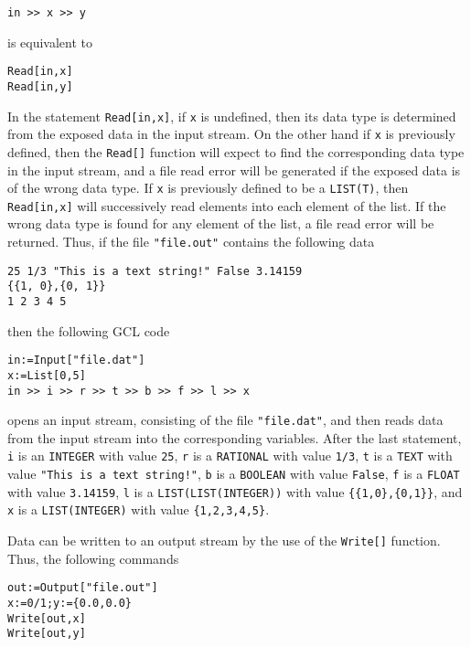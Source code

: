 \begin{verbatim}
in >> x >> y
\end{verbatim}
 
\noindent
is equivalent to 

\begin{verbatim}
Read[in,x]
Read[in,y]
\end{verbatim}

\noindent
In the statement \verb+Read[in,x]+, if \verb+x+ is undefined, then its
data type is determined from the exposed data in the input stream.  On
the other hand if \verb+x+ is previously defined, then the
\verb+Read[]+ function will expect to find the corresponding data type
in the input stream, and a file read error will be generated if the
exposed data is of the wrong data type.  If \verb+x+ is previously
defined to be a \verb+LIST(T)+, then \verb+Read[in,x]+ will
successively read elements into each element of the list.  If the
wrong data type is found for any element of the list, a file read
error will be returned.  Thus, if the file \verb+"file.out"+ contains
the following data

\begin{verbatim}
25 1/3 "This is a text string!" False 3.14159 
{{1, 0},{0, 1}}
1 2 3 4 5
\end{verbatim}

\noindent
then the following GCL code

\begin{verbatim}
in:=Input["file.dat"]
x:=List[0,5]
in >> i >> r >> t >> b >> f >> l >> x
\end{verbatim}

\noindent
opens an input stream, consisting of the file \verb+"file.dat"+, and
then reads data from the input stream into the corresponding
variables.  After the last statement, 
\verb+i+ is an \verb+INTEGER+ with value \verb+25+, 
\verb+r+ is a \verb+RATIONAL+ with value \verb+1/3+, 
\verb+t+ is a \verb+TEXT+ with value \verb+"This is a text string!"+, 
\verb+b+ is a \verb+BOOLEAN+ with value \verb+False+, 
\verb+f+ is a \verb+FLOAT+ with value \verb+3.14159+, 
\verb+l+ is a \verb+LIST(LIST(INTEGER))+ with value \verb+{{1,0},{0,1}}+, and 
\verb+x+ is a \verb+LIST(INTEGER)+ with value \verb+{1,2,3,4,5}+.  

Data can be written to an output stream by the use of the
\verb+Write[]+ function.  Thus, the following commands

\begin{verbatim}
out:=Output["file.out"]
x:=0/1;y:={0.0,0.0}
Write[out,x]
Write[out,y]
\end{verbatim}

